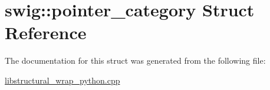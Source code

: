 \hypertarget{structswig_1_1pointer__category}{}\section{swig\+:\+:pointer\+\_\+category Struct Reference}
\label{structswig_1_1pointer__category}


The documentation for this struct was generated from the following file\+:\begin{DoxyCompactItemize}
\item 
\hyperlink{libstructural__wrap__python_8cpp}{libstructural\+\_\+wrap\+\_\+python.\+cpp}\end{DoxyCompactItemize}
